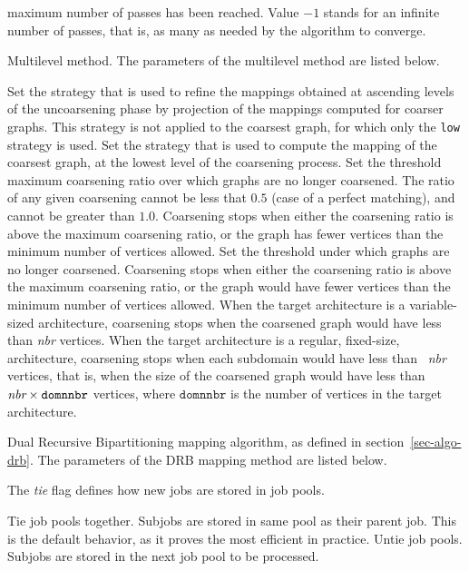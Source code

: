 \begin{itemize}
\begin{itemize}
maximum number of passes has been reached. Value $-1$ stands for an
infinite number of passes, that is, as many as needed by the algorithm
to converge.
\end{itemize}
\iteme[{\tt m}]
Multilevel method. The parameters of the multilevel method are listed below.
\begin{itemize}
\iteme[{\tt asc=}{\it strat}]
Set the strategy that is used to refine the mappings obtained
at ascending levels of the uncoarsening phase by projection of the
mappings computed for coarser graphs.
This strategy is not applied to the coarsest graph, for which only the
{\tt low} strategy is used.
\iteme[{\tt low=}{\it strat}]
Set the strategy that is used to compute the mapping of the
coarsest graph, at the lowest level of the coarsening process.
\iteme[{\tt rat=}{\it rat}]
Set the threshold maximum coarsening ratio over which graphs are no longer
coarsened. The ratio of any given coarsening cannot be less that $0.5$
(case of a perfect matching), and cannot be greater than $1.0$.
Coarsening stops when either the coarsening ratio is above the maximum
coarsening ratio, or the graph has fewer vertices than the minimum number of
vertices allowed.
\iteme[{\tt vert=}{\it nbr}]
Set the threshold under which graphs are no longer
coarsened. Coarsening stops when either the coarsening ratio is above
the maximum coarsening ratio, or the graph would have fewer vertices
than the minimum number of vertices allowed. When the target
architecture is a variable-sized architecture, coarsening stops when
the coarsened graph would have less than \mbox{\it nbr} vertices. When
the target architecture is a regular, fixed-size, architecture,
coarsening stops when each subdomain would have less than \mbox{\it
  nbr} vertices, that is, when the size of the coarsened graph would
have less than $\mbox{\it nbr}\times\mathtt{domnnbr}$ vertices,
where $\mathtt{domnnbr}$ is the number of vertices in the target
architecture.
\end{itemize}
\iteme[{\tt r}]
Dual Recursive Bipartitioning mapping algorithm, as defined in
section~\ref{sec-algo-drb}. The parameters of the DRB mapping method are
listed below.
\begin{itemize}
\iteme[{\tt job=}{\it tie}]
The {\it tie\/} flag defines how new jobs are stored in job pools.
\begin{itemize}
\iteme[{\tt t}]
Tie job pools together. Subjobs are stored in same pool as their parent job.
This is the default behavior, as it proves the most efficient in practice.
\iteme[{\tt u}]
Untie job pools. Subjobs are stored in the next job pool to be processed.

\end{itemize}
\end{itemize}
\end{itemize}
